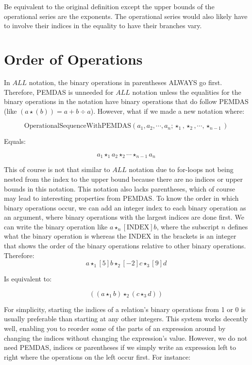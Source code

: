 \documentclass{article}
\begin{document}
Be equivalent to the original definition except the upper bounds of the operational series are the exponents. The operational series would also likely have to involve their indices in the equality to have their branches vary.

\section{Order of Operations}

In $ALL$ notation, the binary operations in parentheses ALWAYS go first. Therefore, PEMDAS is unneeded for $ALL$ notation unless the equalities for the binary operations in the notation have binary operations that do follow PEMDAS (like $(a\star(b))=a+ b \div a$). However, what if we made a new notation where:

$$\text{OperationalSequenceWithPEMDAS}(a_1,a_2,\cdots,a_n;\star_1,\star_2,\cdots,\star_{n-1})$$

Equals:

$$a_1 \star_1 a_2 \star_2 \cdots \star_{n-1} a_n$$

This of course is not that similar to $ALL$ notation due to for-loops not being nested from the index to the upper bound because there are no indices or upper bounds in this notation. This notation also lacks parentheses, which of course may lead to interesting properties from PEMDAS. To know the order in which binary operations occur, we can add an integer index to each binary operation as an argument, where binary operations with the largest indices are done first. We can write the binary operation like $a \star_n [\text{INDEX}] b$, where the subscript $n$ defines what the binary operation is whereas the INDEX in the brackets is an integer that shows the order of the binary operations relative to other binary operations. Therefore:
$$a \star_1[5] b \star_2 [-2] c \star_3 [9] d$$

Is equivalent to:

$$((a \star_1 b) \star_2 (c\star_3d))$$

For simplicity, starting the indices of a relation’s binary operations from 1 or 0 is usually preferable than starting at any other integers. This system works decently well, enabling you to reorder some of the parts of an expression around by changing the indices without changing the expression’s value. However, we do not need PEMDAS, indices or parentheses if we simply write an expression left to right where the operations on the left occur first. For instance:
\end{document}
